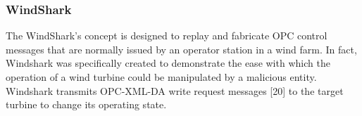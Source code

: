 \documentclass[twosided,a4,10pt]{article}
\begin{document}
\begin{multicols}{2}



\subsubsection{WindShark}

The WindShark’s concept is designed to replay and fabricate OPC control messages that are normally issued by an operator station in a wind farm. In fact, Windshark was specifically created to demonstrate the ease with which the operation of a wind turbine could be manipulated by a malicious entity. Windshark transmits OPC-XML-DA write request messages [20] to the target turbine to 
change its operating state.







 
 

\end{multicols}
\end{document}

